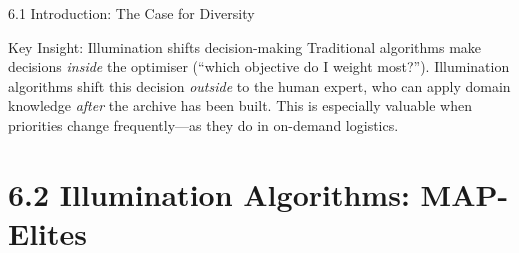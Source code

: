 \documentclass[aspectratio=169,10pt]{beamer}
\begin{document}
\begin{frame}[allowframebreaks]{6.1 Introduction: The Case for Diversity}
\medskip
\begin{alertblock}{Key Insight: Illumination shifts decision-making}
Traditional algorithms make decisions \emph{inside} the optimiser
(``which objective do I weight most?'').
Illumination algorithms shift this decision \emph{outside} to the
human expert, who can apply domain knowledge \emph{after} the
archive has been built.
This is especially valuable when priorities change frequently---as they
do in on-demand logistics.
\end{alertblock}

\end{frame}

\section{6.2 Illumination Algorithms: MAP-Elites}
\end{document}
